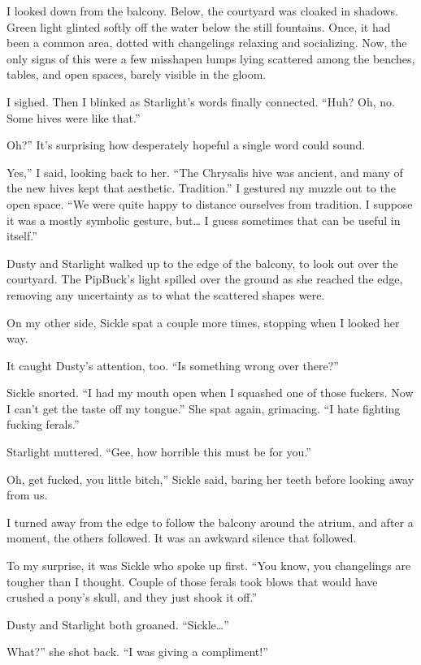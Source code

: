 I looked down from the balcony. Below, the courtyard was cloaked in shadows. Green light glinted softly off the water below the still fountains. Once, it had been a common area, dotted with changelings relaxing and socializing. Now, the only signs of this were a few misshapen lumps lying scattered among the benches, tables, and open spaces, barely visible in the gloom.

I sighed. Then I blinked as Starlight’s words finally connected. “Huh? Oh, no. Some hives were like that.”

\leavevmode{}Oh?” It’s surprising how desperately hopeful a single word could sound.

\leavevmode{}Yes,” I said, looking back to her. “The Chrysalis hive was ancient, and many of the new hives kept that aesthetic. Tradition.” I gestured my muzzle out to the open space. “We were quite happy to distance ourselves from tradition. I suppose it was a mostly symbolic gesture, but… I guess sometimes that can be useful in itself.”

Dusty and Starlight walked up to the edge of the balcony, to look out over the courtyard. The PipBuck’s light spilled over the ground as she reached the edge, removing any uncertainty as to what the scattered shapes were.

On my other side, Sickle spat a couple more times, stopping when I looked her way.

It caught Dusty’s attention, too. “Is something wrong over there?”

Sickle snorted. “I had my mouth open when I squashed one of those fuckers. Now I can’t get the taste off my tongue.” She spat again, grimacing. “I hate fighting fucking ferals.”

Starlight muttered. “Gee, how horrible this must be for you.”

\leavevmode{}Oh, get fucked, you little bitch,” Sickle said, baring her teeth before looking away from us.

I turned away from the edge to follow the balcony around the atrium, and after a moment, the others followed. It was an awkward silence that followed.

To my surprise, it was Sickle who spoke up first. “You know, you changelings are tougher than I thought. Couple of those ferals took blows that would have crushed a pony’s skull, and they just shook it off.”

Dusty and Starlight both groaned. “Sickle…”

\leavevmode{}What?” she shot back. “I was giving a compliment!”

